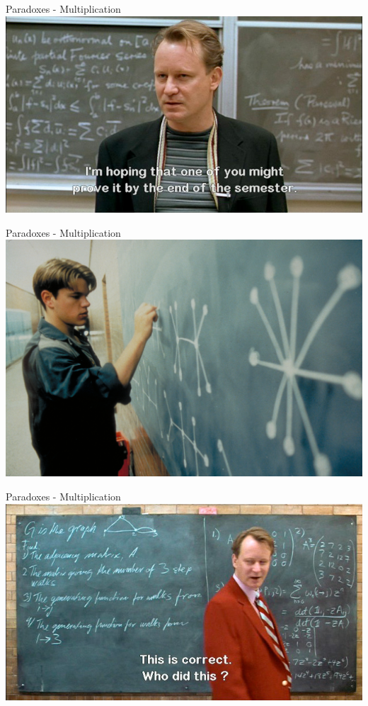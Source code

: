 \documentclass[presentation]{beamer}
\begin{document}
\begin{frame}[label=sec-2-11]{Paradoxes - Multiplication}
\includegraphics[width=.9\linewidth]{./img/gwh-problem-posing.jpg}
\end{frame}
\begin{frame}[label=sec-2-12]{Paradoxes - Multiplication}
\includegraphics[width=.9\linewidth]{./img/gwh-problem-solving.jpg}
\end{frame}
\begin{frame}[label=sec-2-13]{Paradoxes - Multiplication}
\includegraphics[width=.9\linewidth]{./img/gwh-solution-validated.jpg}
\end{frame}
\end{document}
